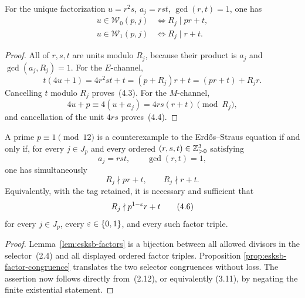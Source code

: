 \begin{proposition}\label{prop:esksb-factor-congruence}
For the unique factorization
\(u=r^2s\), \(a_j=rst\), \(\gcd(r,t)=1\), one has
\begin{align}
 u\in\mathcal W_0(p,j)
 &\Longleftrightarrow R_j\mid pr+t,                           \tag{4.3}\\
 u\in\mathcal W_1(p,j)
 &\Longleftrightarrow R_j\mid r+t.                            \tag{4.4}
\end{align}
\end{proposition}

\begin{proof}
All of \(r,s,t\) are units modulo \(R_j\), because their product is \(a_j\)
and \(\gcd(a_j,R_j)=1\).  For the \(E\)-channel,
\[
 t(4u+1)=4r^2st+t=(p+R_j)r+t=(pr+t)+R_jr.
\]
Cancelling \(t\) modulo \(R_j\) proves~(4.3).  For the \(M\)-channel,
\[
 4u+p\equiv4(u+a_j)=4rs(r+t)\pmod {R_j},
\]
and cancellation of the unit \(4rs\) proves~(4.4).
\end{proof}

\begin{theorem}
A prime \(p\equiv1\pmod {12}\) is a counterexample to the
Erd\H{o}s--Straus equation if and only if, for every \(j\in J_p\) and every
ordered \((r,s,t)\in\mathbb Z_{>0}^3\) satisfying
\[
 a_j=rst,
 \qquad \gcd(r,t)=1,
\]
one has simultaneously
\begin{equation}
 R_j\nmid pr+t,
 \qquad R_j\nmid r+t.                                       \tag{4.5}
\end{equation}
Equivalently, with the tag retained, it is necessary and sufficient that
\begin{equation}
 R_j\nmid p^{1-\varepsilon}r+t                                     \tag{4.6}
\end{equation}
for every \(j\in J_p\), every \(\varepsilon\in\{0,1\}\), and every such factor
triple.
\end{theorem}

\begin{proof}
Lemma~\ref{lem:esksb-factors} is a bijection between all allowed divisors in
the selector~(2.4) and all displayed ordered factor triples.  Proposition
\ref{prop:esksb-factor-congruence} translates the two selector congruences without
loss.  The assertion now follows directly from~(2.12), or equivalently
(3.11), by negating the finite existential statement.
\end{proof}

